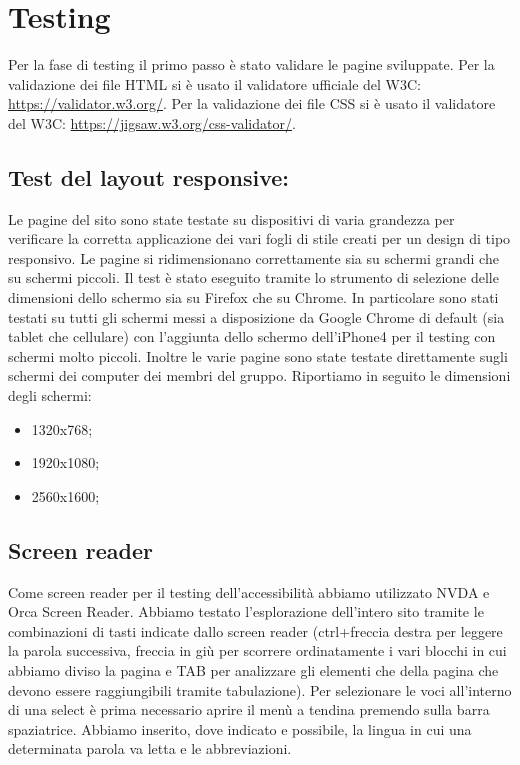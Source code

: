 \newpage
\section{Testing}
Per la fase di testing il primo passo è stato validare le pagine sviluppate.
Per la validazione dei file HTML si è usato il validatore ufficiale del W3C: \url{https://validator.w3.org/}.
Per la validazione dei file CSS si è usato il validatore del W3C: \url{https://jigsaw.w3.org/css-validator/}.

\subsection{Test del layout responsive:} Le pagine del sito sono state testate su dispositivi di varia grandezza per verificare la corretta applicazione dei vari fogli di stile creati per un design di tipo responsivo. Le pagine si ridimensionano correttamente sia su schermi grandi che su schermi piccoli. Il test è stato eseguito tramite lo strumento di selezione delle dimensioni dello schermo sia su Firefox che su Chrome. In particolare sono stati testati su tutti gli schermi messi a disposizione da Google Chrome di default (sia tablet che cellulare) con l'aggiunta dello schermo dell'iPhone4 per il testing con schermi molto piccoli. Inoltre le varie pagine sono state testate direttamente sugli schermi dei computer dei membri del gruppo. Riportiamo in seguito le dimensioni degli schermi:
\begin{itemize}
    \item 1320x768;
    \item 1920x1080;
    \item 2560x1600;
\end{itemize}

\subsection{Screen reader} 
Come screen reader per il testing dell'accessibilità abbiamo utilizzato NVDA e Orca Screen Reader. Abbiamo testato l'esplorazione dell'intero sito tramite le combinazioni di tasti indicate dallo screen reader (ctrl+freccia destra per leggere la parola successiva, freccia in giù per scorrere ordinatamente i vari blocchi in cui abbiamo diviso la pagina e TAB per analizzare gli elementi che della pagina che devono essere raggiungibili tramite tabulazione). Per selezionare le voci all'interno di una select è prima necessario aprire il menù a tendina premendo sulla barra spaziatrice. Abbiamo inserito, dove indicato e possibile, la lingua in cui una determinata parola va letta e le abbreviazioni.

